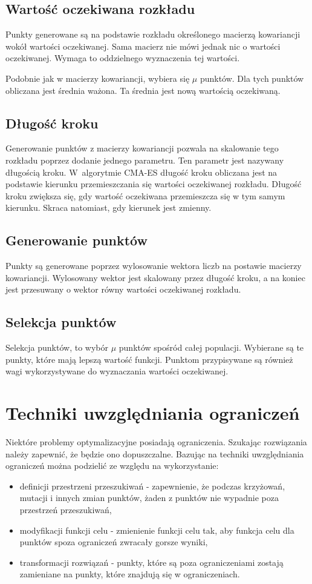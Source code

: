 \documentclass{mini}
\begin{document}
\subsection{Wartość oczekiwana rozkładu}
Punkty generowane są na podstawie rozkładu określonego macierzą kowariancji wokół wartości oczekiwanej. Sama macierz nie mówi jednak nic o wartości oczekiwanej. Wymaga to oddzielnego wyznaczenia tej wartości.

Podobnie jak w macierzy kowariancji, wybiera się $\mu$ punktów. Dla tych punktów obliczana jest średnia ważona. Ta średnia jest nową wartością oczekiwaną.

\subsection{Długość kroku}
Generowanie punktów z macierzy kowariancji pozwala na skalowanie tego rozkładu poprzez dodanie jednego parametru. Ten parametr jest nazywany długością kroku. W~algorytmie CMA-ES długość kroku obliczana jest na podstawie kierunku przemieszczania się wartości oczekiwanej rozkładu. Długość kroku zwiększa się, gdy wartość oczekiwana przemieszcza się w tym samym kierunku. Skraca natomiast, gdy kierunek jest zmienny.

\subsection{Generowanie punktów}
Punkty są generowane poprzez wylosowanie wektora liczb na postawie macierzy kowariancji. Wylosowany wektor jest skalowany przez długość kroku, a na koniec jest przesuwany o wektor równy wartości oczekiwanej rozkładu.

\subsection{Selekcja punktów}
Selekcja punktów, to wybór $\mu$ punktów spośród całej populacji. Wybierane są te punkty, które mają lepszą wartość funkcji. Punktom przypisywane są również wagi wykorzystywane do wyznaczania wartości oczekiwanej.

\pagebreak

\section{Techniki uwzględniania ograniczeń}
Niektóre problemy optymalizacyjne posiadają ograniczenia. Szukając rozwiązania należy zapewnić, że będzie ono dopuszczalne. Bazując na \cite{wyklady} techniki uwzględniania ograniczeń można podzielić ze względu na wykorzystanie:
\begin{itemize}[noitemsep]
\item definicji przestrzeni przeszukiwań - zapewnienie, że podczas krzyżowań, mutacji i innych zmian punktów, żaden z punktów nie wypadnie poza przestrzeń przeszukiwań,
\item modyfikacji funkcji celu - zmienienie funkcji celu tak, aby funkcja celu dla punktów spoza ograniczeń zwracały gorsze wyniki,
\item transformacji rozwiązań - punkty, które są poza ograniczeniami zostają zamieniane na punkty, które znajdują się w ograniczeniach.
\end{itemize}
\end{document}
